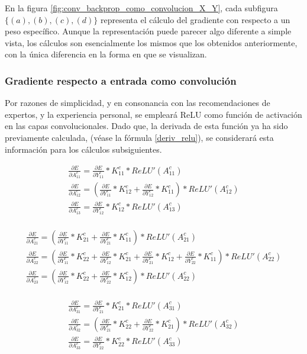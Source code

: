 En la figura \ref{fig:conv_backprop_como_convolucion_X_Y}, cada subfigura $\{(a), (b), (c), (d)\}$ representa el cálculo del gradiente con respecto a un peso específico. Aunque la representación puede parecer algo diferente a simple vista, los cálculos son esencialmente los mismos que los obtenidos anteriormente, con la única diferencia en la forma en que se visualizan.

\subsubsection{Gradiente respecto a entrada como convolución}

Por razones de simplicidad, y en consonancia con las recomendaciones de expertos, y la experiencia personal, se empleará ReLU como función de activación en las capas convolucionales. Dado que, la derivada de esta función ya ha sido previamente calculada, (véase la fórmula \ref{deriv_relu}), se considerará esta información para los cálculos subsiguientes.


\begin{gather}
	\frac{\partial E}{\partial A^c_{11}} = \frac{\partial E}{\partial Y^c_{11}} * K^c_{11} *  ReLU'(A^c_{11}) \\
	\frac{\partial E}{\partial A^c_{12}} = (\frac{\partial E}{\partial Y^c_{11}} * K^c_{12} + \frac{\partial E}{\partial Y^c_{12}} * K^c_{11}) * ReLU'(A^c_{12}) \\
	\frac{\partial E}{\partial A^c_{13}} = \frac{\partial E}{\partial Y^c_{12}} * K^c_{12} * ReLU'(A^c_{13}) \\
\end{gather}

\begin{gather}
	\frac{\partial E}{\partial A^c_{21}} = (\frac{\partial E}{\partial Y^c_{11}} * K^c_{21} + \frac{\partial E}{\partial Y^c_{21}} * K^c_{11}) * ReLU'(A^c_{21}) \\
	\frac{\partial E}{\partial A^c_{22}} = (\frac{\partial E}{\partial Y^c_{11}} * K^c_{22} + \frac{\partial E}{\partial Y^c_{12}} * K^c_{21} + \frac{\partial E}{\partial Y^c_{21}} * K^c_{12} + \frac{\partial E}{\partial Y^c_{22}} * K^c_{11}) * ReLU'(A^c_{22}) \\
	\frac{\partial E}{\partial A^c_{23}} = (\frac{\partial E}{\partial Y^c_{12}} * K^c_{22} + \frac{\partial E}{\partial Y^c_{22}} * K^c_{12}) * ReLU'(A^c_{22})\\
\end{gather}

\begin{gather}
	\frac{\partial E}{\partial A^c_{31}} = \frac{\partial E}{\partial Y^c_{21}} * K^c_{21} * ReLU'(A^c_{31})\\
	\frac{\partial E}{\partial A^c_{32}} = (\frac{\partial E}{\partial Y^c_{21}} * K^c_{22} + \frac{\partial E}{\partial Y^c_{22}} * K^c_{21}) * ReLU'(A^c_{32})\\
	\frac{\partial E}{\partial A^c_{33}} = \frac{\partial E}{\partial Y^c_{22}} * K^c_{22} * ReLU'(A^c_{33})
\end{gather}

